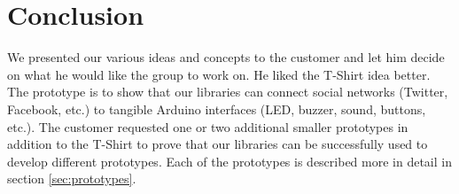 \section{Conclusion}
We presented our various ideas and concepts to the customer and let him decide on what he would
like the group to work on. He liked the T-Shirt idea better. The prototype is to show that our libraries
can connect social networks (Twitter, Facebook, etc.) to tangible Arduino interfaces (LED, buzzer, sound, buttons, etc.).
The customer requested one or two additional smaller prototypes in addition to the T-Shirt to prove that our
libraries can be successfully used to develop different prototypes. Each of the prototypes is described more in detail in 
section \ref{sec:prototypes}.
